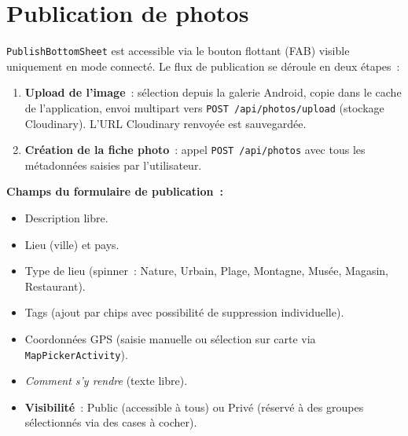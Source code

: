 \documentclass[12pt, a4paper, openany]{report}
\begin{document}
\section{Publication de photos}

\texttt{PublishBottomSheet} est accessible via le bouton flottant (FAB) visible uniquement
en mode connecté. Le flux de publication se déroule en deux étapes~:

\begin{enumerate}
  \item \textbf{Upload de l'image}~: sélection depuis la galerie Android, copie dans le
        cache de l'application, envoi multipart vers \texttt{POST /api/photos/upload}
        (stockage Cloudinary). L'URL Cloudinary renvoyée est sauvegardée.
  \item \textbf{Création de la fiche photo}~: appel \texttt{POST /api/photos} avec tous
        les métadonnées saisies par l'utilisateur.
\end{enumerate}

\textbf{Champs du formulaire de publication~:}
\begin{itemize}
  \item Description libre.
  \item Lieu (ville) et pays.
  \item Type de lieu (spinner~: Nature, Urbain, Plage, Montagne, Musée, Magasin, Restaurant).
  \item Tags (ajout par chips avec possibilité de suppression individuelle).
  \item Coordonnées GPS (saisie manuelle ou sélection sur carte via \texttt{MapPickerActivity}).
  \item \emph{Comment s'y rendre} (texte libre).
  \item \textbf{Visibilité}~: Public (accessible à tous) ou Privé (réservé à des groupes
        sélectionnés via des cases à cocher).
\end{itemize}
\end{document}
